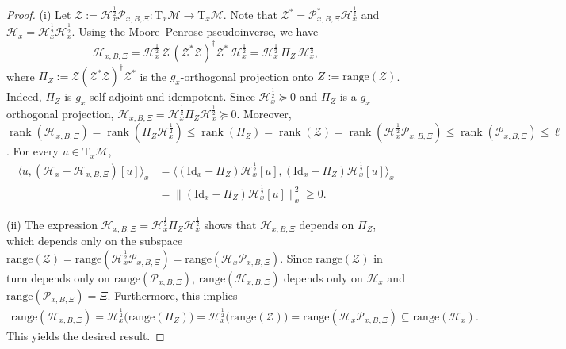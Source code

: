 \documentclass[final,onefignum,onetabnum]{siamart250211}
\begin{document}
  \begin{proof}
\noindent(i) Let $\mathcal{Z}:=\mathcal{H}_x^{\frac{1}{2}}\mathcal{P}_{x, B, \Xi}:\mathrm{T}_x\mathcal M\to \mathrm{T}_x\mathcal M$. Note that $\mathcal{Z}^{*}=\mathcal{P}_{x, B, \Xi}^{*}\mathcal{H}_x^{\frac{1}{2}}$ and $\mathcal{H}_x=\mathcal{H}_x^{\frac{1}{2}}\mathcal{H}_x^{\frac{1}{2}}$. Using the Moore--Penrose pseudoinverse, we have
  \[
  \mathcal{H}_{x, B, \Xi}
  =\mathcal{H}_x^{\frac{1}{2}}\,\mathcal{Z}\,(\mathcal{Z}^{*}\mathcal{Z})^{\dagger}\mathcal{Z}^{*}\,\mathcal{H}_x^{\frac{1}{2}}
  =\mathcal{H}_x^{\frac{1}{2}}\,\Pi_Z\,\mathcal{H}_x^{\frac{1}{2}},
  \]
  where $\Pi_Z:=\mathcal{Z}(\mathcal{Z}^{*}\mathcal{Z})^{\dagger}\mathcal{Z}^{*}$ is the $g_x$-orthogonal projection onto $Z :=\mathrm{range}(\mathcal{Z})$. Indeed, $\Pi_Z$ is $g_x$-self-adjoint and idempotent. 
  Since $\mathcal{H}_x^{\frac{1}{2}}\succeq 0$ and $\Pi_Z$ is a $g_x$-orthogonal projection, $\mathcal{H}_{x, B, \Xi}=\mathcal{H}_x^{\frac{1}{2}}\Pi_Z \mathcal{H}_x^{\frac{1}{2}}\succeq 0$. Moreover, $\operatorname{rank}(\mathcal{H}_{x, B, \Xi})=\operatorname{rank}(\Pi_Z\mathcal{H}_x^{\frac{1}{2}})\le \operatorname{rank}(\Pi_Z)=\operatorname{rank}(\mathcal{Z}) = \operatorname{rank}(\mathcal{H}_x^{\frac{1}{2}} \mathcal{P}_{x, B, \Xi})\le \operatorname{rank}(\mathcal{P}_{x, B, \Xi})\le \ell$.
  For every \(u\in \mathrm{T}_x\mathcal M\),
  \[
  \begin{aligned}
  \langle u,(\mathcal{H}_x-\mathcal{H}_{x, B, \Xi})[u]\rangle_x
  &=\langle (\mathrm{Id}_x-\Pi_Z)\mathcal{H}_x^{\frac{1}{2}}[u],(\mathrm{Id}_x-\Pi_Z)\mathcal{H}_x^{\frac{1}{2}}[u]\rangle_x \\
  &=\|(\mathrm{Id}_x-\Pi_Z)\mathcal{H}_x^{\frac{1}{2}}[u]\|_x^2 
  \ge 0.
  \end{aligned}
  \]

\noindent(ii) The expression $\mathcal{H}_{x, B, \Xi}=\mathcal{H}_x^{\frac{1}{2}}\Pi_Z \mathcal{H}_x^{\frac{1}{2}}$ shows that $\mathcal{H}_{x, B, \Xi}$ depends on $\Pi_Z$, which depends only on the subspace $\mathrm{range}(\mathcal{Z})=\mathrm{range}(\mathcal{H}_x^{\frac{1}{2}}\mathcal{P}_{x, B, \Xi}) = \mathrm{range}(\mathcal{H}_x\mathcal{P}_{x, B, \Xi}) $. Since $\mathrm{range}(\mathcal{Z})$ in turn depends only on $\mathrm{range}(\mathcal{P}_{x, B, \Xi})$,  $\mathrm{range}(\mathcal{H}_{x, B, \Xi})$ depends only on $\mathcal{H}_x$ and $\mathrm{range}(\mathcal{P}_{x, B, \Xi}) = \Xi$. Furthermore, this implies
  \begin{align*}
  \mathrm{range}(\mathcal{H}_{x, B, \Xi})
  =\mathcal{H}_x^{\frac{1}{2}}\big(\mathrm{range}(\Pi_Z)\big)
  =\mathcal{H}_x^{\frac{1}{2}}\big(\mathrm{range}(\mathcal{Z})\big)
  =\mathrm{range}(\mathcal{H}_x\mathcal{P}_{x, B, \Xi})
  \subseteq \mathrm{range}(\mathcal{H}_x).
  \end{align*}
  This yields the desired result.
  \end{proof}
\end{document}
